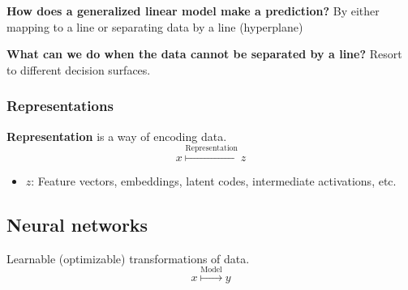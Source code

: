 \documentclass{article}
\begin{document}
\begin{notes} \textbf{How does a generalized linear model make a prediction?}
    By either mapping to a line or separating data by a line (hyperplane)
\end{notes}

\begin{notes} \textbf{What can we do when the data cannot be separated by a line?}
    Resort to different decision surfaces.
\end{notes}

\subsubsection{Representations}
\begin{definition}
    \textbf{Representation} is a way of encoding data.
    \begin{equation}
        x \overset{\text{Representation}}{\mapsto} z
    \end{equation}
    \begin{itemize}
        \item $z$: Feature vectors, embeddings, latent codes, intermediate activations, etc.
    \end{itemize}
\end{definition}
\begin{notes}
\end{notes}

\subsection{Neural networks}
\begin{definition}
    Learnable (optimizable) transformations of data.
    \begin{equation}
        x \overset{\text{Model}}{\mapsto} y
    \end{equation}
\end{definition}
\end{document}
